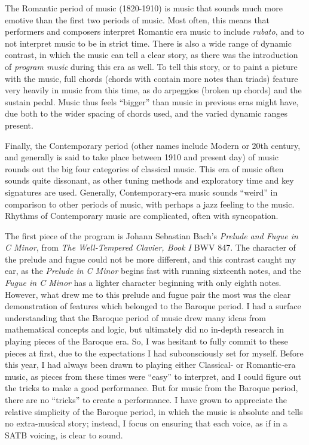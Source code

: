 The Romantic period of music (1820-1910) is music that sounds much more emotive than the first two periods of music. Most often, this means that performers and composers interpret Romantic era music to include \textit{rubato}, and to not interpret music to be in strict time. There is also a wide range of dynamic contrast, in which the music can tell a clear story, as there was the introduction of \textit{program music} during this era as well. To tell this story, or to paint a picture with the music, full chords (chords with contain more notes than triads) feature very heavily in music from this time, as do arpeggios (broken up chords) and the sustain pedal. Music thus feels ``bigger'' than music in previous eras might have, due both to the wider spacing of chords used, and the varied dynamic ranges present. 

Finally, the Contemporary period (other names include Modern or 20th century, and generally is said to take place between 1910 and present day) of music rounds out the big four categories of classical music. This era of music often sounds quite dissonant, as other tuning methods and exploratory time and key signatures are used. Generally, Contemporary-era music sounds ``weird'' in comparison to other periods of music, with perhaps a jazz feeling to the music. Rhythms of Contemporary music are complicated, often with syncopation. 

The first piece of the program is Johann Sebastian Bach's \textit{Prelude and Fugue in C Minor}, from \textit{The Well-Tempered Clavier, Book I} BWV 847. The character of the prelude and fugue could not be more different, and this contrast caught my ear, as the \textit{Prelude in C Minor} begins fast with running sixteenth notes, and the \textit{Fugue in C Minor} has a lighter character beginning with only eighth notes. However, what drew me to this prelude and fugue pair the most was the clear demonstration of features which belonged to the Baroque period. I had a surface understanding that the Baroque period of music drew many ideas from mathematical concepts and logic, but ultimately did no in-depth research in playing pieces of the Baroque era. So, I was hesitant to fully commit to these pieces at first, due to the expectations I had subconsciously set for myself. Before this year, I had always been drawn to playing either Classical- or Romantic-era music, as pieces from these times were ``easy'' to interpret, and I could figure out the tricks to make a good performance. But for music from the Baroque period, there are no ``tricks'' to create a performance. I have grown to appreciate the relative simplicity of the Baroque period, in which the music is absolute and tells no extra-musical story; instead, I focus on ensuring that each voice, as if in a SATB voicing, is clear to sound.

